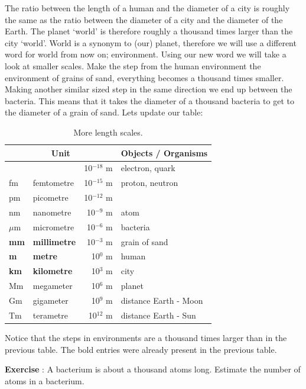 \documentclass[12pt,a4paper]{article}
\numberwithin{equation}{section}
\numberwithin{figure}{section}
\newcounter{Exercise}
\numberwithin{table}{section}
\begin{document}
The ratio between the length of a human and the diameter of a city is roughly the same as the ratio between the diameter of a city and the diameter of the Earth. The planet `world' is therefore roughly a thousand times larger than the city `world'. World is a synonym to (our) planet, therefore we will use a different word for world from now on; environment. Using our new word we will take a look at smaller scales. Make the step from the human environment the environment of grains of sand, everything becomes a thousand times smaller. Making another similar sized step in the same direction we end up between the bacteria. This means that it takes the diameter of a thousand bacteria to get to the diameter of a grain of sand. Lets update our table:
\begin{table}[h]\begin{centering}
\begin{tabular}{|l|l|r|l|}
\hline \multicolumn{3}{|c|}{Unit} & \multicolumn{1}{c|}{Objects / Organisms}  \\ \hline \hline
& & 10$^{-18}$ m & electron, quark  \\ \hline
fm & femtometre & 10$^{-15}$ m & proton, neutron  \\ \hline
pm & picometre & 10$^{-12}$ m &  \\ \hline
nm & nanometre & 10$^{-9}$ m & atom  \\ \hline
$\mu$m & micrometre & 10$^{-6}$ m & bacteria  \\ \hline
\textbf{mm} & \textbf{millimetre} & 10$^{-3}$ m & grain of sand  \\ \hline
\textbf{m} & \textbf{metre} & 10$^{0}$ m & human  \\ \hline
\textbf{km} & \textbf{kilometre} & 10$^{3}$ m & city  \\ \hline
Mm & megameter & 10$^{6}$ m & planet  \\ \hline
Gm & gigameter & 10$^{9}$ m & distance Earth - Moon  \\ \hline
Tm & terametre & 10$^{12}$ m & distance Earth - Sun  \\ \hline 
\end{tabular}
\caption{More length scales.}\label{tab:length_scales2}
\end{centering}\end{table}

Notice that the steps in environments are a thousand times larger than in the previous table. The bold entries were already present in the previous table.

\begin{shaded}
\textbf{Exercise \theExercise {}} : A bacterium is about a thousand atoms long. Estimate the number of atoms in a bacterium.\end{shaded}
\end{document}
